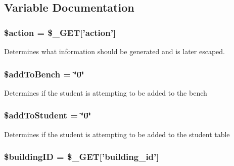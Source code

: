 \subsection{\-Variable \-Documentation}
\hypertarget{checkRooms2_8php_aa698a3e72116e8e778be0e95d908ee30}{
\subsubsection[{\$action}]{\setlength{\rightskip}{0pt plus 5cm}\$action = \$\-\_\-\-G\-E\-T\mbox{[}'action'\mbox{]}}}\label{checkRooms2_8php_aa698a3e72116e8e778be0e95d908ee30}
\-Determines what information should be generated and is later escaped. \hypertarget{checkRooms2_8php_a203f48bd509ef90819599e761f574023}{
\subsubsection[{\$add\-To\-Bench}]{\setlength{\rightskip}{0pt plus 5cm}\$add\-To\-Bench = \char`\"{}0\char`\"{}}}\label{checkRooms2_8php_a203f48bd509ef90819599e761f574023}
\-Determines if the student is attempting to be added to the bench \hypertarget{checkRooms2_8php_ab8b532875ded9bdf4075f627ddf2fa78}{
\subsubsection[{\$add\-To\-Student}]{\setlength{\rightskip}{0pt plus 5cm}\$add\-To\-Student = \char`\"{}0\char`\"{}}}\label{checkRooms2_8php_ab8b532875ded9bdf4075f627ddf2fa78}
\-Determines if the student is attempting to be added to the student table \hypertarget{checkRooms2_8php_acfaa0ff73c631ce07c4851ed12fcd83d}{
\subsubsection[{\$building\-I\-D}]{\setlength{\rightskip}{0pt plus 5cm}\$building\-I\-D = \$\-\_\-\-G\-E\-T\mbox{[}'building\-\_\-id'\mbox{]}}}\label{checkRooms2_8php_acfaa0ff73c631ce07c4851ed12fcd83d}
